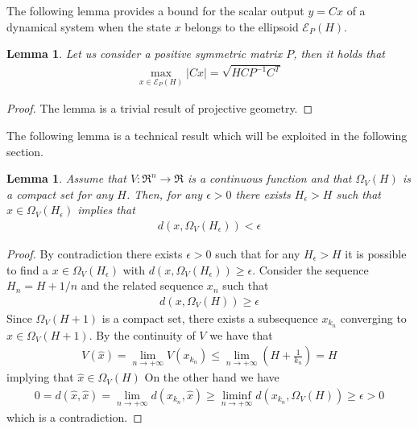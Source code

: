 \documentclass[letterpaper,10pt,twocolumn,journal,final]{IEEEtran}
\newtheorem{lem}[thm]{Lemma}
\newcommand{\eps}{\epsilon}
\newcommand{\ellips}{\mathcal{E}}
\begin{document}
The following lemma provides a bound for the scalar output $y=Cx$ of a dynamical system when the state $x$ belongs to the ellipsoid $\ellips_P(H)$.
\begin{lem}\label{lem:BoundY}
Let us consider a positive symmetric matrix $P$, then it holds that
	\begin{align}
		\max_{x\in\mathcal{E}_P(H)} |Cx| 
			= \sqrt{H C P^{-1} C^T}
	\end{align}
\end{lem}
\begin{proof}
	The lemma is a trivial result of projective geometry.
\end{proof}
The following lemma is a technical result which will be exploited in the following section.
\begin{lem}\label{lem:equivalence Lyap and Norm}
	Assume that $V:\Re^n\rightarrow \Re$ is a continuous function and that $\Omega_V(H)$ is a compact set for any $H$. Then, for any $\eps>0$ there exists $H_{\eps}>H$ such that $x\in \Omega_V(H_{\eps})$ implies that
	\begin{align}
		d(x,\Omega_V(H_{\eps}))<\eps
	\end{align}
\end{lem}
\begin{proof}
	By contradiction there exists $\eps>0$ such that for any $H_{\eps}>H$ it is possible to find a $x\in \Omega_V(H_{\eps})$ with $d(x,\Omega_V(H_{\eps}))\geq\eps$.
	Consider the sequence $H_{n}=H+1/n$ and the related sequence $x_n$ such that
	\begin{align}
		d(x,\Omega_V(H))\geq\eps
	\end{align} 
	Since $\Omega_V(H+1)$ is a compact set, there exists a subsequence $x_{k_n}$  converging to $\hat x \in \Omega_V(H+1)$. By the continuity of $V$ we have that
	\begin{align}
		V(\hat x)= \lim_{n\rightarrow+\infty} V(x_{k_n})\leq
			\lim_{n\rightarrow+\infty} \left( H+\frac{1}{k_n}\right)=H
	\end{align}
	implying that $\hat x \in \Omega_V(H)$
	On the other hand we have
	\begin{align}
		0=d(\hat x, \hat x) =
			\lim_{n\rightarrow+\infty} d(x_{k_n},\hat x)\geq
			\liminf_{n\rightarrow+\infty} d(x_{k_n},\Omega_V(H))\geq
				\eps >0
	\end{align}
	which is a contradiction.
\end{proof}
\end{document}
